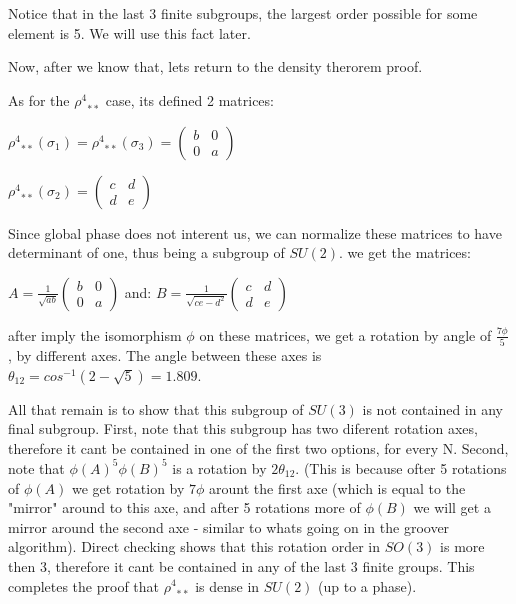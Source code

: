 \documentclass{article}
\begin{document}
Notice that in the last 3 finite subgroups, the largest order possible for some element is 5. We will use this fact later. 

Now, after we know that, lets return to the density therorem proof.

As for the ${\rho^{4}}_{**}$ case, its defined 2 matrices:

${\rho^{4}}_{**}(\sigma_{1}) = {\rho^{4}}_{**}(\sigma_{3}) = \begin{pmatrix} b & 0 \\ 0 & a \end{pmatrix}$

${\rho^{4}}_{**}(\sigma_{2}) =  \begin{pmatrix} c & d \\ d & e \end{pmatrix}$

Since global phase does not interent us, we can normalize these matrices to have determinant of one, thus being a subgroup of $SU(2)$. we get the matrices:

$A = \frac{1}{\sqrt{ab}} \begin{pmatrix}  b & 0 \\ 0 & a \end{pmatrix}$
and:
$B = \frac{1}{\sqrt{ce - d^{2}}}  \begin{pmatrix} c & d \\ d & e \end{pmatrix}$

after imply the isomorphism $\phi$ on these matrices, we get a rotation by angle of $\frac{7{\phi}}{5}$, by different axes. The angle between these axes is $\theta_{12} = cos^{-1}(2 - \sqrt{5}) = 1.809$.

All that remain is to show that this subgroup of $SU(3)$ is not contained in any final subgroup. First, note that this subgroup has two diferent rotation axes, therefore it cant be contained in one of the first two options, for every N. Second, note that ${\phi(A)}^{5}{\phi(B)}^{5}$ is a rotation by $2\theta_{12}$. (This is because ofter 5 rotations of $\phi(A)$ we get rotation by $7\phi$ arount the first axe (which is equal to the "mirror" around to this axe, and after 5 rotations more of $\phi(B)$ we will get a mirror around the second axe - similar to whats going on in the groover algorithm). Direct checking shows that this rotation order in $SO(3)$ is more then 3, therefore  it cant be contained in any of the last 3 finite groups. This completes the proof that  ${\rho^{4}}_{**}$ is dense in $SU(2)$ (up to a phase). 
\end{document}
